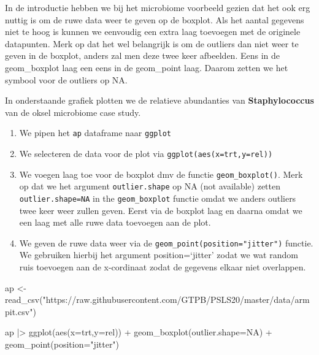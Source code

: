 \documentclass[
  dutch,
  letterpaper,
  12pt]{book}
\newenvironment{Shaded}{\begin{snugshade}}{\end{snugshade}}
\newcommand{\AttributeTok}[1]{\textcolor[rgb]{0.40,0.45,0.13}{#1}}
\newcommand{\ConstantTok}[1]{\textcolor[rgb]{0.56,0.35,0.01}{#1}}
\newcommand{\FunctionTok}[1]{\textcolor[rgb]{0.28,0.35,0.67}{#1}}
\newcommand{\NormalTok}[1]{\textcolor[rgb]{0.00,0.23,0.31}{#1}}
\newcommand{\OtherTok}[1]{\textcolor[rgb]{0.00,0.23,0.31}{#1}}
\newcommand{\SpecialCharTok}[1]{\textcolor[rgb]{0.37,0.37,0.37}{#1}}
\newcommand{\StringTok}[1]{\textcolor[rgb]{0.13,0.47,0.30}{#1}}
\providecommand{\tightlist}{%
  \setlength{\itemsep}{0pt}\setlength{\parskip}{0pt}}
\theoremstyle{definition}
\theoremstyle{definition}
\theoremstyle{definition}
\theoremstyle{remark}
\begin{document}
In de introductie hebben we bij het microbiome voorbeeld gezien dat het
ook erg nuttig is om de ruwe data weer te geven op de boxplot. Als het
aantal gegevens niet te hoog is kunnen we eenvoudig een extra laag
toevoegen met de originele datapunten. Merk op dat het wel belangrijk is
om de outliers dan niet weer te geven in de boxplot, anders zal men deze
twee keer afbeelden. Eens in de geom\_boxplot laag een eens in de
geom\_point laag. Daarom zetten we het symbool voor de outliers op NA.

In onderstaande grafiek plotten we de relatieve abundanties van
\textbf{Staphylococcus} van de oksel microbiome case study.

\begin{enumerate}
\def\labelenumi{\arabic{enumi}.}
\tightlist
\item
  We pipen het \texttt{ap} dataframe naar \texttt{ggplot}
\item
  We selecteren de data voor de plot via
  \texttt{ggplot(aes(x=trt,y=rel))}
\item
  We voegen laag toe voor de boxplot dmv de functie
  \texttt{geom\_boxplot()}. Merk op dat we het argument
  \texttt{outlier.shape} op NA (not available) zetten
  \texttt{outlier.shape=NA} in the \texttt{geom\_boxplot} functie omdat
  we anders outliers twee keer weer zullen geven. Eerst via de boxplot
  laag en daarna omdat we een laag met alle ruwe data toevoegen aan de
  plot.
\item
  We geven de ruwe data weer via de
  \texttt{geom\_point(position="jitter")} functie. We gebruiken hierbij
  het argument position=`jitter' zodat we wat random ruis toevoegen aan
  de x-cordinaat zodat de gegevens elkaar niet overlappen.
\end{enumerate}

\begin{Shaded}
\begin{Highlighting}[]
\NormalTok{ap }\OtherTok{\textless{}{-}} \FunctionTok{read\_csv}\NormalTok{(}\StringTok{"https://raw.githubusercontent.com/GTPB/PSLS20/master/data/armpit.csv"}\NormalTok{)}

\NormalTok{ap }\SpecialCharTok{|\textgreater{}}  
  \FunctionTok{ggplot}\NormalTok{(}\FunctionTok{aes}\NormalTok{(}\AttributeTok{x=}\NormalTok{trt,}\AttributeTok{y=}\NormalTok{rel)) }\SpecialCharTok{+}
  \FunctionTok{geom\_boxplot}\NormalTok{(}\AttributeTok{outlier.shape=}\ConstantTok{NA}\NormalTok{) }\SpecialCharTok{+}
  \FunctionTok{geom\_point}\NormalTok{(}\AttributeTok{position=}\StringTok{"jitter"}\NormalTok{)}
\end{Highlighting}
\end{Shaded}
\end{document}
